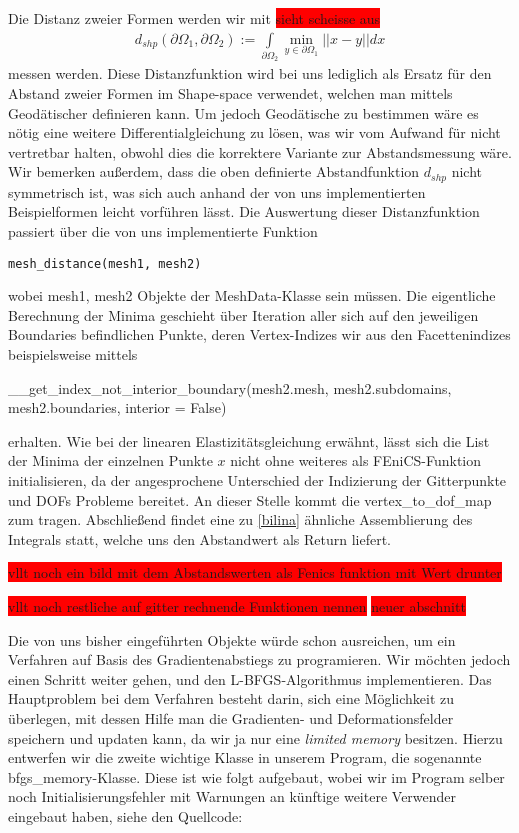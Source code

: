\documentclass[bibliography=totoc,12pt,a4paper]{scrartcl}
\theoremstyle{exampstyle}
\numberwithin{equation}{section}
\begin{document}
Die Distanz zweier Formen werden wir mit 
\colorbox{red}{sieht scheisse aus}
\begin{align}\label{distfktdef}
	d_{shp}(\partial\Omega_1, \partial\Omega_2) := \underset{\partial\Omega_2}{\int} \underset{y\in\partial\Omega_1}{\min} \vert\vert x - y \vert\vert dx
\end{align}
messen werden. Diese Distanzfunktion wird bei uns lediglich als Ersatz für den Abstand zweier Formen im Shape-space verwendet, welchen man mittels Geodätischer definieren kann. Um jedoch Geodätische zu bestimmen wäre es nötig eine weitere Differentialgleichung zu lösen, was wir vom Aufwand für nicht vertretbar halten, obwohl dies die korrektere Variante zur Abstandsmessung wäre. Wir bemerken außerdem, dass die oben definierte Abstandfunktion $d_{shp}$ nicht symmetrisch ist, was sich auch anhand der von uns implementierten Beispielformen leicht vorführen lässt. Die Auswertung dieser Distanzfunktion passiert über die von uns implementierte Funktion
\begin{lstlisting}
mesh_distance(mesh1, mesh2)
\end{lstlisting}
wobei \textsf{mesh1, mesh2} Objekte der \textsf{MeshData}-Klasse sein müssen. Die eigentliche Berechnung der Minima geschieht über Iteration aller sich auf den jeweiligen Boundaries befindlichen Punkte, deren Vertex-Indizes wir aus den Facettenindizes beispielsweise mittels     
\begin{center}
\textsf{\_\_get\_index\_not\_interior\_boundary(mesh2.mesh, mesh2.subdomains, mesh2.boundaries, interior = False)}
\end{center}
erhalten. Wie bei der linearen Elastizitätsgleichung erwähnt, lässt sich die List der Minima der einzelnen Punkte $x$ nicht ohne weiteres als FEniCS-Funktion initialisieren, da der angesprochene Unterschied der Indizierung der Gitterpunkte und DOFs Probleme bereitet. An dieser Stelle kommt die vertex\_to\_dof\_map zum tragen. Abschließend findet eine zu \ref{bilina} ähnliche Assemblierung des Integrals statt, welche uns den Abstandwert als Return liefert. 

\colorbox{red}{vllt noch ein bild mit dem Abstandswerten als Fenics funktion mit Wert drunter}

\colorbox{red}{vllt noch restliche auf gitter rechnende Funktionen nennen}
\colorbox{red}{neuer abschnitt}

Die von uns bisher eingeführten Objekte würde schon ausreichen, um ein Verfahren auf Basis des Gradientenabstiegs zu programieren. Wir möchten jedoch einen Schritt weiter gehen, und den L-BFGS-Algorithmus implementieren. Das Hauptproblem bei dem Verfahren besteht darin, sich eine Möglichkeit zu überlegen, mit dessen Hilfe man die Gradienten- und Deformationsfelder speichern und updaten kann, da wir ja nur eine \textit{limited memory} besitzen. Hierzu entwerfen wir die zweite wichtige Klasse in unserem Program, die sogenannte \textsf{bfgs\_memory}-Klasse. Diese ist wie folgt aufgebaut, wobei wir im Program selber noch Initialisierungsfehler mit Warnungen an künftige weitere Verwender eingebaut haben, siehe den Quellcode:
\end{document}
